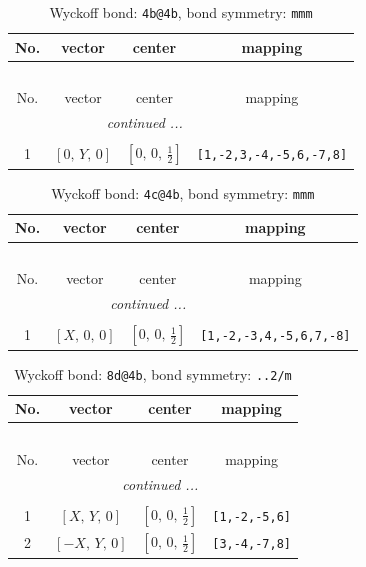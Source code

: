 \documentclass[fleqn,8pt]{jsarticle}
\begin{document}
\begin{longtable}{cccc}
\caption{Wyckoff bond: {\tt 4b@4b}, bond symmetry: {\tt mmm}}
 \\
 \hline \hline
No. & vector & center & mapping \\ \hline \endfirsthead

\multicolumn{3}{l}{\tablename\ \thetable{}} \\
 \hline \hline
No. & vector & center & mapping \\ \hline \endhead

 \hline \hline
\multicolumn{3}{r}{\footnotesize\it continued ...} \\ \endfoot

 \hline \hline
\multicolumn{3}{r}{} \\ \endlastfoot

1 & $\left[ 0,\, Y,\, 0 \right]$ & $\left[ 0,\, 0,\, \frac{1}{2} \right]$ & {\tt [1,-2,3,-4,-5,6,-7,8]} \\
\end{longtable}
\renewcommand{\arraystretch}{1.2}
\begin{longtable}{cccc}
\caption{Wyckoff bond: {\tt 4c@4b}, bond symmetry: {\tt mmm}}
 \\
 \hline \hline
No. & vector & center & mapping \\ \hline \endfirsthead

\multicolumn{3}{l}{\tablename\ \thetable{}} \\
 \hline \hline
No. & vector & center & mapping \\ \hline \endhead

 \hline \hline
\multicolumn{3}{r}{\footnotesize\it continued ...} \\ \endfoot

 \hline \hline
\multicolumn{3}{r}{} \\ \endlastfoot

1 & $\left[ X,\, 0,\, 0 \right]$ & $\left[ 0,\, 0,\, \frac{1}{2} \right]$ & {\tt [1,-2,-3,4,-5,6,7,-8]} \\
\end{longtable}
\renewcommand{\arraystretch}{1.2}
\begin{longtable}{cccc}
\caption{Wyckoff bond: {\tt 8d@4b}, bond symmetry: {\tt ..2/m}}
 \\
 \hline \hline
No. & vector & center & mapping \\ \hline \endfirsthead

\multicolumn{3}{l}{\tablename\ \thetable{}} \\
 \hline \hline
No. & vector & center & mapping \\ \hline \endhead

 \hline \hline
\multicolumn{3}{r}{\footnotesize\it continued ...} \\ \endfoot

 \hline \hline
\multicolumn{3}{r}{} \\ \endlastfoot

1 & $\left[ X,\, Y,\, 0 \right]$ & $\left[ 0,\, 0,\, \frac{1}{2} \right]$ & {\tt [1,-2,-5,6]} \\ \hline
2 & $\left[ - X,\, Y,\, 0 \right]$ & $\left[ 0,\, 0,\, \frac{1}{2} \right]$ & {\tt [3,-4,-7,8]} \\
\end{longtable}
\end{document}
